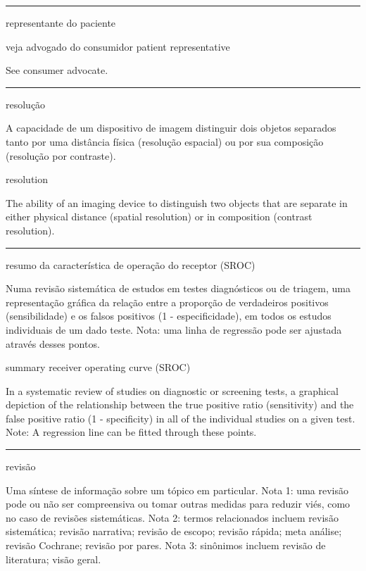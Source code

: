 \documentclass[
  openany]{book}
\begin{document}
\begin{center}\rule{0.5\linewidth}{0.5pt}\end{center}

representante do paciente

veja advogado do consumidor
patient representative

See consumer advocate.

\begin{center}\rule{0.5\linewidth}{0.5pt}\end{center}

resolução

A capacidade de um dispositivo de imagem distinguir dois objetos separados tanto por uma distância física (resolução espacial) ou por sua composição (resolução por contraste).

resolution

The ability of an imaging device to distinguish two objects that are separate in either physical distance (spatial resolution) or in composition (contrast resolution).

\begin{center}\rule{0.5\linewidth}{0.5pt}\end{center}

resumo da característica de operação do receptor (SROC)

Numa revisão sistemática de estudos em testes diagnósticos ou de triagem, uma representação gráfica da relação entre a proporção de verdadeiros positivos (sensibilidade) e os falsos positivos (1 - especificidade), em todos os estudos individuais de um dado teste. Nota: uma linha de regressão pode ser ajustada através desses pontos.

summary receiver operating curve (SROC)

In a systematic review of studies on diagnostic or screening tests, a graphical depiction of the relationship between the true positive ratio (sensitivity) and the false positive ratio (1 - specificity) in all of the individual studies on a given test. Note: A regression line can be fitted through these points.

\begin{center}\rule{0.5\linewidth}{0.5pt}\end{center}

revisão

Uma síntese de informação sobre um tópico em particular. Nota 1: uma revisão pode ou não ser compreensiva ou tomar outras medidas para reduzir viés, como no caso de revisões sistemáticas. Nota 2: termos relacionados incluem revisão sistemática; revisão narrativa; revisão de escopo; revisão rápida; meta análise; revisão Cochrane; revisão por pares. Nota 3: sinônimos incluem revisão de literatura; visão geral.
\end{document}
